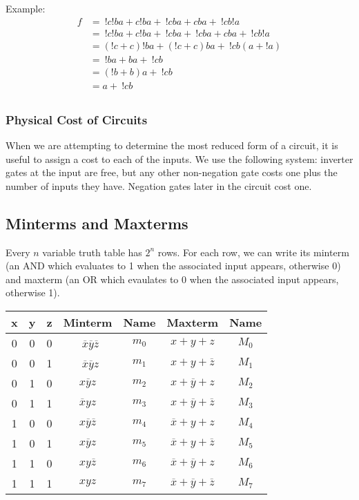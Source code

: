 \documentclass[12pt]{article}
\begin{document}
Example:
\begin{align*}
f &=\ !c!ba + c!ba +\ !cba + cba        +\ !cb!a\\
  &=\ !c!ba + c!ba +\ !cba +\ !cba + cba +\ !cb!a\\
  &= (!c + c)!ba  + (!c + c)ba  +\ !cb(a + !a)\\
  &=\ !ba          + ba          +\ !cb\\
  &= (!b + b)a +\ !cb\\
  &= a +\ !cb\\
\end{align*}

\subsubsection*{Physical Cost of Circuits}
When we are attempting to determine the most reduced form of a circuit, it is useful to assign a cost to each of the inputs. We use the following system: inverter gates at the input are free, but any other non-negation gate costs one plus the number of inputs they have. Negation gates later in the circuit cost one.

\subsection*{Minterms and Maxterms}
Every $n$ variable truth table has $2^n$ rows. For each row, we can write its minterm (an AND which evaluates to 1 when the associated input appears, otherwise 0) and maxterm (an OR which evaulates to 0 when the associated input appears, otherwise 1).

\begin{table}[ht]
\centering
  \begin{tabular}{ccc|cc|cc}
  x & y & z & Minterm                 & Name  & Maxterm                       & Name  \\ \hline
  0 & 0 & 0 & $\overline{x}\overline{y}\overline{z}$ & $m_0$ & $x + y + z$                   & $M_0$ \\
  0 & 0 & 1 & $\overline{x}\overline{y}z$       & $m_1$ & $x + y + \overline{z}$             & $M_1$ \\
  0 & 1 & 0 & $x\overline{y}z$             & $m_2$ & $x + \overline{y} + z$             & $M_2$ \\
  0 & 1 & 1 & $\overline{x}yz$             & $m_3$ & $x + \overline{y} + \overline{z}$       & $M_3$ \\
  1 & 0 & 0 & $x\overline{y}\overline{z}$       & $m_4$ & $\overline{x} + y + z$             & $M_4$ \\
  1 & 0 & 1 & $x\overline{y}z$             & $m_5$ & $\overline{x} + y + \overline{z}$       & $M_5$ \\
  1 & 1 & 0 & $xy\overline{z}$             & $m_6$ & $\overline{x} + \overline{y} + z$       & $M_6$ \\
  1 & 1 & 1 & $xyz$                   & $m_7$ & $\overline{x} + \overline{y} + \overline{z}$ & $M_7$ \\
  \end{tabular}
\end{table}
\end{document}

